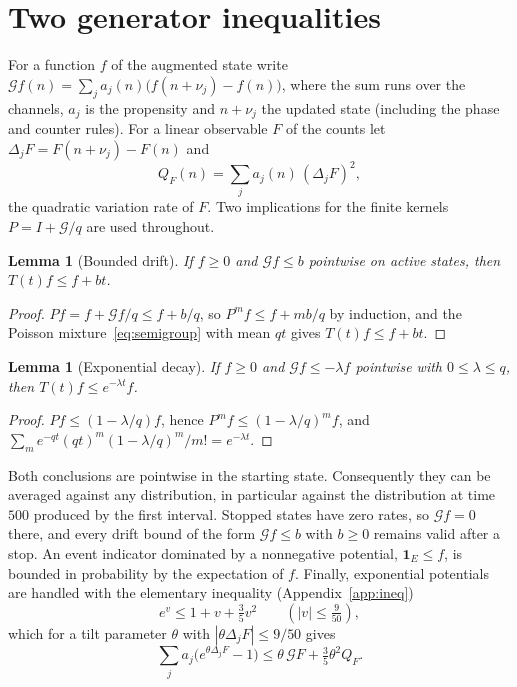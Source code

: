 \documentclass[11pt,a4paper]{article}
\theoremstyle{plain}
\newtheorem{lemma}[theorem]{Lemma}
\theoremstyle{definition}
\theoremstyle{remark}
\newcommand{\G}{\mathcal G}
\newcommand{\ind}{\mathbf 1}
\begin{document}
\section{Two generator inequalities}\label{sec:tools}

For a function $f$ of the augmented state write $\G f(n)=\sum_j a_j(n)\bigl(f(n+\nu_j)-f(n)\bigr)$, where the sum runs over the channels, $a_j$ is the propensity and $n+\nu_j$ the updated state (including the phase and counter rules). For a linear observable $F$ of the counts let $\Delta_jF=F(n+\nu_j)-F(n)$ and
\[
Q_F(n)=\sum_j a_j(n)\,(\Delta_jF)^2 ,
\]
the quadratic variation rate of $F$. Two implications for the finite kernels $P=I+\G/q$ are used throughout.

\begin{lemma}[Bounded drift]\label{lem:foster}
If $f\ge0$ and $\G f\le b$ pointwise on active states, then $T(t)f\le f+bt$.
\end{lemma}
\begin{proof}
$Pf=f+\G f/q\le f+b/q$, so $P^mf\le f+mb/q$ by induction, and the Poisson mixture~\eqref{eq:semigroup} with mean $qt$ gives $T(t)f\le f+bt$.
\end{proof}

\begin{lemma}[Exponential decay]\label{lem:decay}
If $f\ge0$ and $\G f\le-\lambda f$ pointwise with $0\le\lambda\le q$, then $T(t)f\le e^{-\lambda t}f$.
\end{lemma}
\begin{proof}
$Pf\le(1-\lambda/q)f$, hence $P^mf\le(1-\lambda/q)^mf$, and $\sum_m e^{-qt}(qt)^m(1-\lambda/q)^m/m!=e^{-\lambda t}$.
\end{proof}

Both conclusions are pointwise in the starting state. Consequently they can be averaged against any distribution, in particular against the distribution at time $500$ produced by the first interval. Stopped states have zero rates, so $\G f=0$ there, and every drift bound of the form $\G f\le b$ with $b\ge0$ remains valid after a stop. An event indicator dominated by a nonnegative potential, $\ind_E\le f$, is bounded in probability by the expectation of $f$. Finally, exponential potentials are handled with the elementary inequality (Appendix~\ref{app:ineq})
\begin{equation}\label{eq:expquad}
e^v\le 1+v+\tfrac35v^2\qquad(|v|\le\tfrac9{50}),
\end{equation}
which for a tilt parameter $\theta$ with $|\theta\Delta_jF|\le 9/50$ gives
\begin{equation}\label{eq:tilt-generic}
\sum_j a_j\bigl(e^{\theta\Delta_jF}-1\bigr)\le\theta\,\G F+\tfrac35\theta^2Q_F .
\end{equation}
\end{document}
